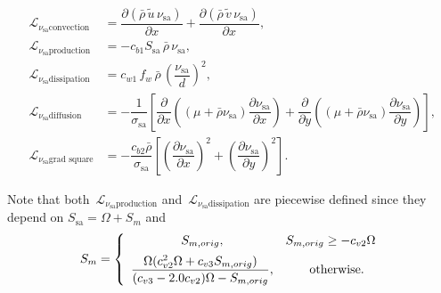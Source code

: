 \documentclass[10pt]{article}
\newcommand{\Diff}[2] {\dfrac{\partial\left( #1\right)}{\partial #2}}
\newcommand{\diff}[2] {\dfrac{\partial #1}{\partial #2}}
\newcommand{\Lo}{\,\mathcal{L}}
\newcommand{\sa}{\nu_{\mathrm{sa}}}
\newcommand{\tsa}{\mathrm{sa}}
\newcommand{\brho}{\bar{\rho}}
\newcommand{\tu}{\tilde{u}}
\newcommand{\tv}{\tilde{v}}
\newcommand{\bmu}{\bar{\mu}}
\begin{document}
\begin{equation}
 \begin{split}
  \Lo_{\sa \text{convection}} &= \Diff{\brho \, \tu \, \sa}{x} +  \Diff{\brho \, \tv \, \sa}{x},\\
  \Lo_{\sa \text{production}} &=- c_{b1} S_\tsa \, \bar{\rho} \, \sa ,\\
  \Lo_{\sa \text{dissipation}}&=c_{w1} \, f_w \, \brho \, \left(\dfrac{\sa}{d}\right)^2 ,\\
  \Lo_{\sa \text{diffusion}}  &=- \dfrac{1}{\sigma_{\tsa}}\left[\diff{}{x}\left((\mu+\brho \sa) \diff{\sa}{x}\right)+ \diff{}{y}\left((\mu+\brho \sa) \diff{\sa}{y}\right)  \right], \\%
  \Lo_{\sa \text{grad square}} &= -\dfrac{c_{b2} \bar{\rho} }{\sigma_{\tsa}}\left[ \left(\diff{\sa}{x}\right)^2 +  \left(\diff{\sa}{y}\right)^2\right]. %
 \end{split}
\end{equation}

Note that both $\Lo_{\sa \text{production}}$ and $\Lo_{\sa \text{dissipation}}$ are piecewise defined since they depend on $ S_{\mathrm{sa}} = \Omega + S_m$ and 
\begin{equation*}
S_m = \left\{ \begin{array}{cc}
S_{m, orig}, & S_{m,orig} \geq -c_{v2} \Omega \vspace{5pt}\\ 
\dfrac{\Omega (c_{v2}^2 \Omega + c_{v3} S_{m,orig})}{ (c_{v3}-2.0c_{v2}) \Omega - S_{m,orig}}, & \quad \mathrm{otherwise}.
\end{array}
\right.
\end{equation*}
\end{document}
